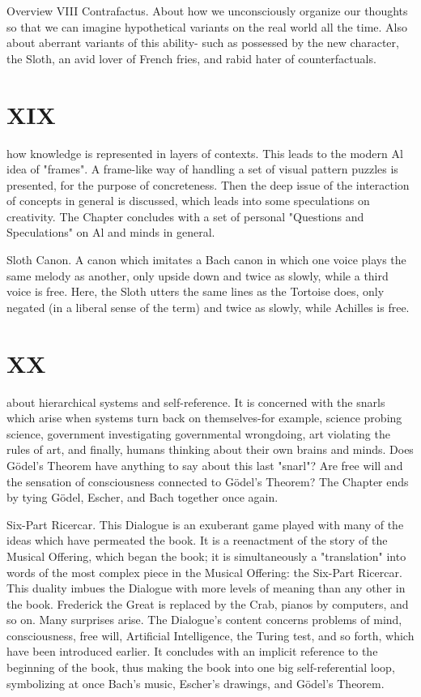 Overview                                                                                     VIII Contrafactus. About how we unconsciously organize our thoughts so that we can imagine hypothetical variants on the real world all the time. Also about aberrant variants of this ability- such as possessed by the new character, the Sloth, an avid lover of French fries, and rabid hater of counterfactuals. 


\chapter {XIX}
how knowledge is represented in layers of contexts. This leads to the modern Al idea of "frames". A frame-like way of handling a set of visual pattern puzzles is presented, for the purpose of concreteness. Then the deep issue of the interaction of concepts in general is discussed, which leads into some speculations on creativity. The Chapter concludes with a set of personal "Questions and Speculations" on Al and minds in general. 

Sloth Canon. A canon which imitates a Bach canon in which one voice plays the same melody as another, only upside down and twice as slowly, while a third voice is free. Here, the Sloth utters the same lines as the Tortoise does, only negated (in a liberal sense of the term) and twice as slowly, while Achilles is free. 


\chapter {XX}
about hierarchical systems and self-reference. It is concerned with the snarls which arise when systems turn back on themselves-for example, science probing science, government investigating governmental wrongdoing, art violating the rules of art, and finally, humans thinking about their own brains and minds. Does Gödel’s Theorem have anything to say about this last "snarl"? Are free will and the sensation of consciousness connected to Gödel’s Theorem? The Chapter ends by tying Gödel, Escher, and Bach together once again. 

Six-Part Ricercar. This Dialogue is an exuberant game played with many of the ideas which have permeated the book. It is a reenactment of the story of the Musical Offering, which began the book; it is simultaneously a "translation" into words of the most complex piece in the Musical Offering: the Six-Part Ricercar. This duality imbues the Dialogue with more levels of meaning than any other in the book. Frederick the Great is replaced by the Crab, pianos by computers, and so on. Many surprises arise. The Dialogue's content concerns problems of mind, consciousness, free will, Artificial Intelligence, the Turing test, and so forth, which have been introduced earlier. It concludes with an implicit reference to the beginning of the book, thus making the book into one big self-referential loop, symbolizing at once Bach's music, Escher's drawings, and Gödel’s Theorem. 







